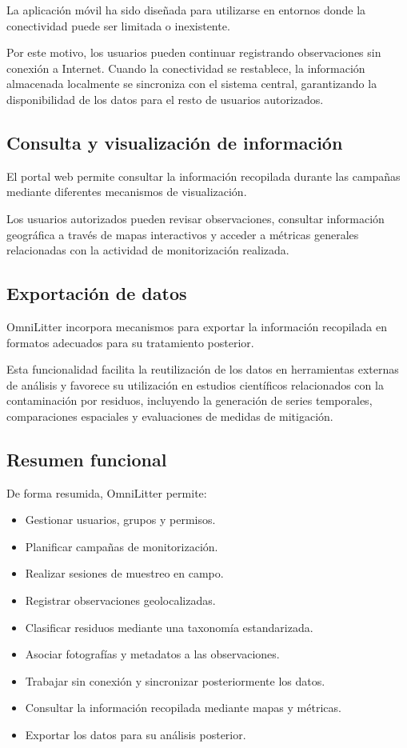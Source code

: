 La aplicación móvil ha sido diseñada para utilizarse en entornos donde la conectividad puede ser limitada o inexistente.

Por este motivo, los usuarios pueden continuar registrando observaciones sin conexión a Internet. Cuando la conectividad se restablece, la información almacenada localmente se sincroniza con el sistema central, garantizando la disponibilidad de los datos para el resto de usuarios autorizados.

\subsection{Consulta y visualización de información}

El portal web permite consultar la información recopilada durante las campañas mediante diferentes mecanismos de visualización.

Los usuarios autorizados pueden revisar observaciones, consultar información geográfica a través de mapas interactivos y acceder a métricas generales relacionadas con la actividad de monitorización realizada.

\subsection{Exportación de datos}

OmniLitter incorpora mecanismos para exportar la información recopilada en formatos adecuados para su tratamiento posterior.

Esta funcionalidad facilita la reutilización de los datos en herramientas externas de análisis y favorece su utilización en estudios científicos relacionados con la contaminación por residuos, incluyendo la generación de series temporales, comparaciones espaciales y evaluaciones de medidas de mitigación.

\subsection{Resumen funcional}

De forma resumida, OmniLitter permite:

\begin{itemize}
    \item Gestionar usuarios, grupos y permisos.
    \item Planificar campañas de monitorización.
    \item Realizar sesiones de muestreo en campo.
    \item Registrar observaciones geolocalizadas.
    \item Clasificar residuos mediante una taxonomía estandarizada.
    \item Asociar fotografías y metadatos a las observaciones.
    \item Trabajar sin conexión y sincronizar posteriormente los datos.
    \item Consultar la información recopilada mediante mapas y métricas.
    \item Exportar los datos para su análisis posterior.
\end{itemize}

